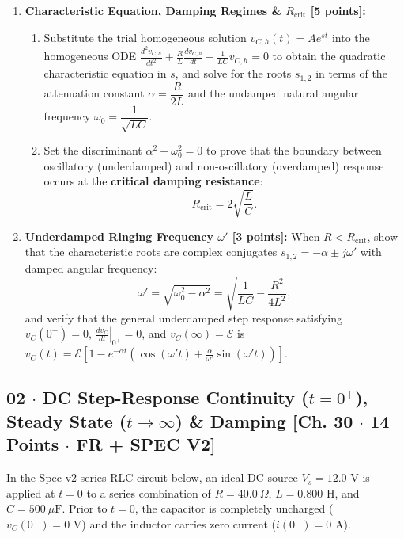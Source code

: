 \documentclass[10pt,letterpaper]{article}
\begin{document}
{{{\begin{enumerate}
  \item \textbf{Characteristic Equation, Damping Regimes \& $R_{\text{crit}}$ [5 points]:}
    \begin{enumerate}
      \item Substitute the trial homogeneous solution $v_{C,h}(t) = A e^{st}$ into the homogeneous ODE $\frac{d^2 v_{C,h}}{dt^2} + \frac{R}{L}\frac{dv_{C,h}}{dt} + \frac{1}{LC}v_{C,h} = 0$ to obtain the quadratic characteristic equation in $s$, and solve for the roots $s_{1,2}$ in terms of the attenuation constant $\alpha = \dfrac{R}{2L}$ and the undamped natural angular frequency $\omega_0 = \dfrac{1}{\sqrt{LC}}$.
      \item Set the discriminant $\alpha^2 - \omega_0^2 = 0$ to prove that the boundary between oscillatory (underdamped) and non-oscillatory (overdamped) response occurs at the \textbf{critical damping resistance}:
      $$R_{\text{crit}} = 2\sqrt{\frac{L}{C}}.$$
    \end{enumerate}
  
  \item \textbf{Underdamped Ringing Frequency $\omega'$ [3 points]:} When $R < R_{\text{crit}}$, show that the characteristic roots are complex conjugates $s_{1,2} = -\alpha \pm j\omega'$ with damped angular frequency:
  $$\omega' = \sqrt{\omega_0^2 - \alpha^2} = \sqrt{\frac{1}{LC} - \frac{R^2}{4L^2}},$$
  and verify that the general underdamped step response satisfying $v_C(0^+)=0$, $\left.\frac{dv_C}{dt}\right|_{0^+}=0$, and $v_C(\infty)=\mathcal{E}$ is $v_C(t) = \mathcal{E}\left[1 - e^{-\alpha t}\left(\cos(\omega' t) + \frac{\alpha}{\omega'}\sin(\omega' t)\right)\right]$.
\end{enumerate}
\vspace{1.2in}


\newpage



\subsection*{02 $\cdot$ DC Step-Response Continuity ($t=0^+$), Steady State ($t\to\infty$) \& Damping \hfill [Ch. 30 $\cdot$ 14 Points $\cdot$ FR + SPEC V2]}

In the Spec v2 series RLC circuit below, an ideal DC source $V_s = 12.0\text{ V}$ is applied at $t = 0$ to a series combination of $R = 40.0\ \Omega$, $L = 0.800\text{ H}$, and $C = 500\ \mu\text{F}$. Prior to $t = 0$, the capacitor is completely uncharged ($v_C(0^-) = 0\text{ V}$) and the inductor carries zero current ($i(0^-) = 0\text{ A}$).

}}}
\end{document}
